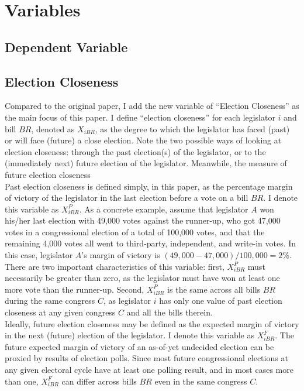 \documentclass[ProjectKWK]{subfiles}
\begin{document}
\hypertarget{Estimation Strategy}{}

\section{Variables}

\subsection{Dependent Variable}\label{subsec:DependentVariable}

\subsection{Election Closeness}\label{subsec:ElectionCloseness}

Compared to the original \cite{IM14} paper, I add the new variable of ``Election Closeness'' as the main focus of this paper. I define ``election closeness'' for each legislator $i$ and bill $BR$, denoted as $X_{iBR}$, as the degree to which the legislator has faced (past) or will face (future) a close election. Note the two possible ways of looking at election closeness: through the past election(s) of the legislator, or to the (immediately next) future election of the legislator. Meanwhile, the measure of future election closeness
\\

Past election closeness is defined simply, in this paper, as the percentage margin of victory of the legislator in the last election before a vote on a bill $BR$. I denote this variable as $X^{P}_{iBR}$. As a concrete example, assume that legislator $A$ won his/her last election with 49,000 votes against the runner-up, who got 47,000 votes in a congressional election of a total of 100,000 votes, and that the remaining 4,000 votes all went to third-party, independent, and write-in votes. In this case, legislator $A$'s margin of victory is $(49,000-47,000)/100,000 = 2\%$. There are two important characteristics of this variable: first, $X^{P}_{iBR}$ must necessarily be greater than zero, as the legislator must have won at least one more vote than the runner-up. Second, $X^{P}_{iBR}$ is the same across all bills $BR$ during the same congress $C$, as legislator $i$ has only one value of past election closeness at any given congress $C$ and all the bills therein. \\

Ideally, future election closeness may be defined as the expected margin of victory in the next (future) election of the legislator. I denote this variable as $X^{F}_{iBR}$. The future expected margin of victory of an as-of-yet undecided election can be proxied by results of election polls. Since most future congressional elections at any given electoral cycle have at least one polling result, and in most cases more than one, $X^{F}_{iBR}$ can differ across bills $BR$ even in the same congress $C$.
\end{document}
